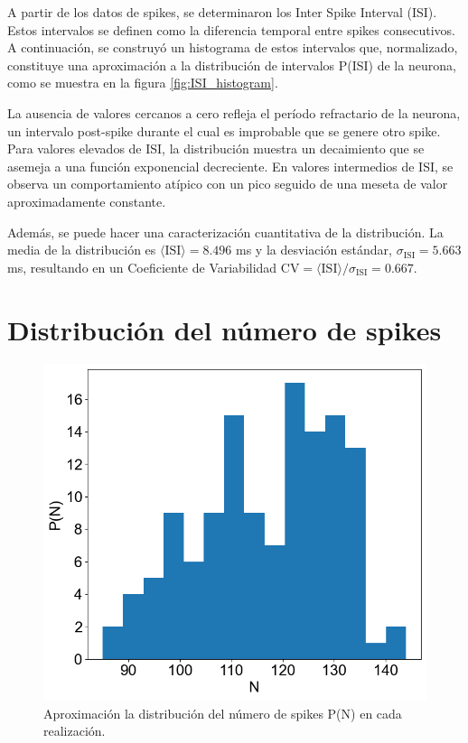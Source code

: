 \documentclass[aps,prb,twocolumn,superscriptaddress,floatfix,longbibliography]{revtex4-2}
\begin{document}
A partir de los datos de spikes, se determinaron los Inter Spike Interval (ISI). Estos intervalos se definen como la diferencia temporal entre spikes consecutivos. A continuación, se construyó un histograma de estos intervalos que, normalizado, constituye una aproximación a la distribución de intervalos P(ISI) de la neurona, como se muestra en la figura \ref{fig:ISI_histogram}.

La ausencia de valores cercanos a cero refleja el período refractario de la neurona, un intervalo post-spike durante el cual es improbable que se genere otro spike. Para valores elevados de ISI, la distribución muestra un decaimiento que se asemeja a una función exponencial decreciente. En valores intermedios de ISI, se observa un comportamiento atípico con un pico seguido de una meseta de valor aproximadamente constante.

Además, se puede hacer una caracterización cuantitativa de la distribución. La media de la distribución es $\langle \mathrm{ISI} \rangle = 8.496$ ms y la desviación estándar, $\sigma_{\mathrm{ISI}} = 5.663$ ms, resultando en un Coeficiente de Variabilidad $\mathrm{CV} = \langle \mathrm{ISI} \rangle / \sigma_{\mathrm{ISI}} =  0.667$.

\section{Distribución del número de spikes}

\begin{figure}[h]
  \includegraphics[clip=true,width=0.9\columnwidth]{N_histogram.png}
  \caption{Aproximación la distribución del número de spikes P(N) en cada realización.}
   \label{fig:N_histogram}
\end{figure}
\end{document}
